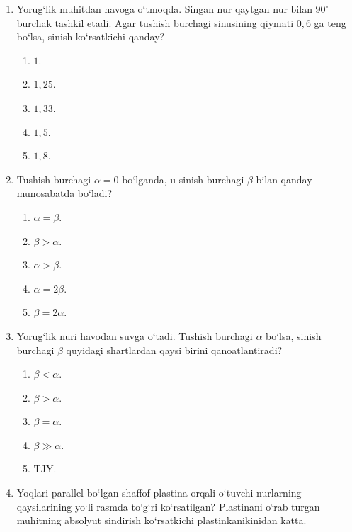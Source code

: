 \begin{enumerate}
\item Yorug‘lik muhitdan havoga o‘tmoqda. Singan nur qaytgan nur bilan $90^\circ$ burchak tashkil etadi. Agar tushish burchagi sinusining qiymati $0{,}6$ ga teng bo‘lsa, sinish ko‘rsatkichi qanday?
\begin{enumerate}[label=\Alph*)]
\item $1$.
\item $1{,}25$.
\item $1{,}33$.
\item $1{,}5$.
\item $1{,}8$.
\end{enumerate}

\item Tushish burchagi $\alpha=0$ bo‘lganda, u sinish burchagi $\beta$ bilan qanday munosabatda bo‘ladi?
\begin{enumerate}[label=\Alph*)]
\item $\alpha=\beta$.
\item $\beta>\alpha$.
\item $\alpha>\beta$.
\item $\alpha=2\beta$.
\item $\beta=2\alpha$.
\end{enumerate}

\item Yorug‘lik nuri havodan suvga o‘tadi. Tushish burchagi $\alpha$ bo‘lsa, sinish burchagi $\beta$ quyidagi shartlardan qaysi birini qanoatlantiradi?
\begin{enumerate}[label=\Alph*)]
\item $\beta<\alpha$.
\item $\beta>\alpha$.
\item $\beta=\alpha$.
\item $\beta\gg\alpha$.
\item TJY.
\end{enumerate}

\item Yoqlari parallel bo‘lgan shaffof plastina orqali o‘tuvchi nurlarning qaysilarining yo‘li rasmda to‘g‘ri ko‘rsatilgan? Plastinani o‘rab turgan muhitning absolyut sindirish ko‘rsatkichi plastinkanikinidan katta.

\end{enumerate}
